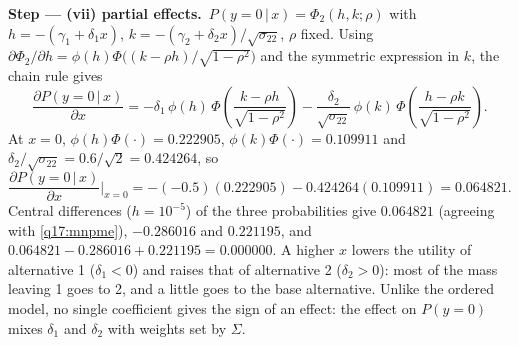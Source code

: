 \documentclass[11pt,a4paper]{article}
\numberwithin{equation}{questao}
\newcommand{\passo}[2]{\par\smallskip\noindent\textbf{Step --- #1.}~#2}
\begin{document}
\begin{sol}
\passo{(vii) partial effects}{$P(y=0\,|\,x)=\Phi_2(h,k;\rho)$ with $h=-(\gamma_1+\delta_1x)$, $k=-(\gamma_2+\delta_2x)/\sqrt{\sigma_{22}}$,
$\rho$ fixed. Using $\partial\Phi_2/\partial h=\phi(h)\Phi\big((k-\rho h)/\sqrt{1-\rho^2}\big)$ and the symmetric expression in $k$,
the chain rule gives
\begin{equation}
\frac{\partial P(y=0\,|\,x)}{\partial x}=-\delta_1\,\phi(h)\,\Phi\!\left(\frac{k-\rho h}{\sqrt{1-\rho^2}}\right)-\frac{\delta_2}{\sqrt{\sigma_{22}}}\,\phi(k)\,\Phi\!\left(\frac{h-\rho k}{\sqrt{1-\rho^2}}\right). \label{q17:mnpme}
\end{equation}
At $x=0$, $\phi(h)\Phi(\cdot)=0.222905$, $\phi(k)\Phi(\cdot)=0.109911$ and $\delta_2/\sqrt{\sigma_{22}}=0.6/\sqrt2=0.424264$, so
\begin{equation*}
\frac{\partial P(y=0\,|\,x)}{\partial x}\Big|_{x=0}=-(-0.5)(0.222905)-0.424264(0.109911)=0.064821 .
\end{equation*}
Central differences ($h=10^{-5}$) of the three probabilities give $0.064821$ (agreeing with \eqref{q17:mnpme}),
$-0.286016$ and $0.221195$, and $0.064821-0.286016+0.221195=0.000000$. A higher $x$ lowers the utility of
alternative 1 ($\delta_1<0$) and raises that of alternative 2 ($\delta_2>0$): most of the mass leaving 1 goes to 2,
and a little goes to the base alternative. Unlike the ordered model, no single coefficient gives the sign of an
effect: the effect on $P(y=0)$ mixes $\delta_1$ and $\delta_2$ with weights set by $\Sigma$.}


\end{sol}
\end{document}
